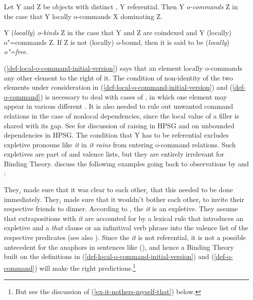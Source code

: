 \documentclass[output=paper,biblatex,babelshorthands,newtxmath,draftmode,colorlinks,citecolor=brown]{langscibook}
\begin{document}
\eanoraggedright
\label{def-o-command}
Let Y and Z be  objects with distinct \localvs, Y referential. Then Y \emph{o-commands} Z 
in the case that Y locally o-commands X dominating Z.
\z

\eanoraggedright
\label{def-o-bind}
Y (\emph{locally}) \emph{o-binds} Z in the case that Y and Z are coindexed and Y (locally) o"=commands Z. If Z
is not (locally) o-bound, then it is said to be (\emph{locally}) \emph{o"=free}.
\z

\noindent
(\ref{def-local-o-command-initial-version}) says that an \argst element locally o-commands any other \argst element
to the right of it. The condition of non-identity of the two elements under consideration in
(\ref{def-local-o-command-initial-version}) and (\ref{def-o-command}) is necessary to deal with cases of , in
which one element may appear in various different \argstls. It is also needed to rule out unwanted
command relations in the case of nonlocal dependencies, since the local value of a filler is shared
with its gap. See %
 for discussion of raising in HPSG and  on
unbounded dependencies in HPSG. The condition that Y has
to be referential excludes expletive pronouns like \emph{it} in \emph{it rains} from entering
o-command relations. Such expletives are part of \argst and valence lists, but they are entirely
irrelevant for Binding Theory. 
\citet[]{ps2} discuss the following examples going back to observations by
\citet[]{FH83a-u} and \citet[]{Kuno87a-u}:

\ealnoraggedright
\ex They$_i$ made sure that it was clear to each other$_i$ that this needed to be done immediately.
\ex They$_i$ made sure that it wouldn't bother each other$_i$ to invite their respective friends to dinner.
\zl
According to \citet[Section~3.6]{ps2}, the \emph{it} is an expletive. They assume that
extrapositions with \emph{it} are accounted for by a lexical rule that introduces an expletive and a
\emph{that} clause or an infinitival verb phrase into the valence list of the respective predicates
(see also ). Since the \emph{it} is
not referential, it is not a possible antecedent for the anaphors in sentences like (), and
hence a Binding Theory built on the definitions in
(\ref{def-local-o-command-initial-version}) and (\ref{def-o-command}) will make the right
predictions.\footnote{
But see the discussion of (\ref{ex-it-nothers-myself-that}) below.
} 
\end{document}
